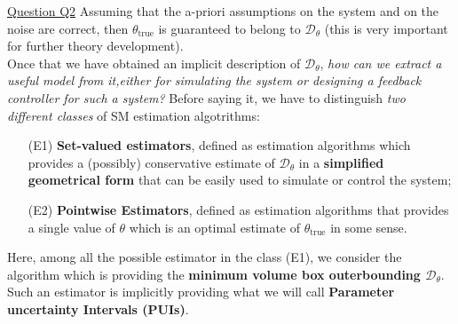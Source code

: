 \noindent
\textsf{\underline{Question Q2}} Assuming that the a-priori assumptions on the system and on the noise are correct, then $\theta_{\text{true}}$ is guaranteed to belong to $\mathcal{D}_\theta$ (this is very important for further theory development).\\

\noindent
Once that we have obtained an implicit description of $\mathcal{D}_\theta$, \textit{how can we extract a useful model from it,either for simulating the system or designing a feedback controller for such a system?} Before saying it, we have to  distinguish \textit{two different classes} of SM estimation algotrithms: 
\begin{itemize}
    \itemsep-0.2em
    \item[(E1)] \textsf{\textbf{\color{red} Set-valued estimators}}, defined as estimation algorithms which provides a (possibly) conservative estimate of $\mathcal{D}_\theta$ in a \textbf{simplified geometrical form} that can be easily used to simulate or control the system; 
    \item[(E2)] \textsf{\textbf{\color{red} Pointwise Estimators}}, defined as estimation algorithms that provides a single value of $\theta$ which is an optimal estimate of $\theta_{\text{true}}$ in some sense.
\end{itemize}
Here, among all the possible estimator in the class (E1), we consider the algorithm which is providing the \textbf{minimum volume box outerbounding $\mathcal{D}_\theta$}. Such an estimator is implicitly providing what we will call \textbf{Parameter uncertainty Intervals (PUIs)}. 

